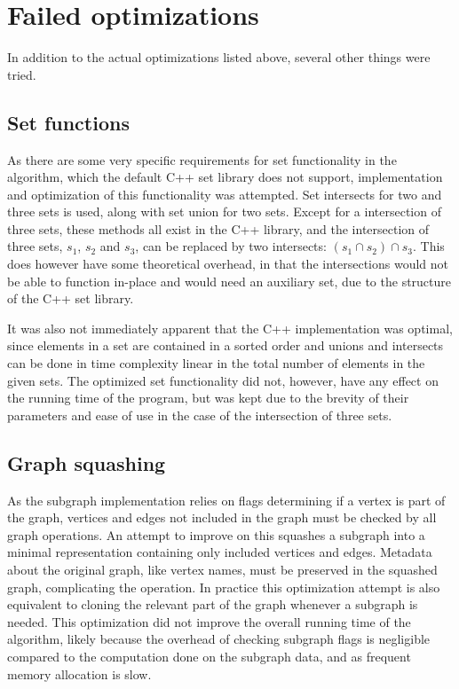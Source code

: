 \documentclass{article}
\begin{document}
	\section{Failed optimizations}
	In addition to the actual optimizations listed above, several other things were tried.

		\subsection{Set functions}
		As there are some very specific requirements for set functionality in the algorithm, which the default C++ set library does not support, implementation and optimization of this functionality was attempted.
		Set intersects for two and three sets is used, along with set union for two sets.
		Except for a intersection of three sets, these methods all exist in the C++ library, and the intersection of three sets, $s_1$, $s_2$ and $s_3$, can be replaced by two intersects: $(s_1 \cap s_2) \cap s_3$.
		This does however have some theoretical overhead, in that the intersections would not be able to function in-place and would need an auxiliary set, due to the structure of the C++ set library.

		It was also not immediately apparent that the C++ implementation was optimal, since elements in a set are contained in a sorted order and unions and intersects can be done in time complexity linear in the total number of elements in the given sets.
		The optimized set functionality did not, however, have any effect on the running time of the program, but was kept due to the brevity of their parameters and ease of use in the case of the intersection of three sets.
		
		\subsection{Graph squashing}
		As the subgraph implementation relies on flags determining if a vertex is part of the graph, vertices and edges not included in the graph must be checked by all graph operations.
		An attempt to improve on this squashes a subgraph into a minimal representation containing only included vertices and edges.
		Metadata about the original graph, like vertex names, must be preserved in the squashed graph, complicating the operation.
		In practice this optimization attempt is also equivalent to cloning the relevant part of the graph whenever a subgraph is needed. This optimization did not improve the overall running time of the algorithm, likely because the overhead of checking subgraph flags is negligible compared to the computation done on the subgraph data, and as frequent memory allocation is slow.
\end{document}
